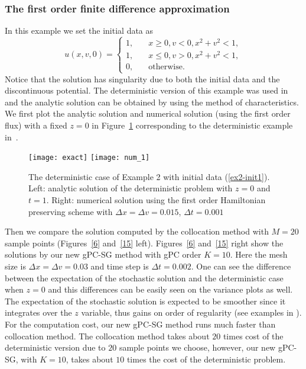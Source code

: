 \documentclass[12pt]{article}
\theoremstyle{plain}
\theoremstyle{remark}
\theoremstyle{remark}
\theoremstyle{remark}
\numberwithin{equation}{section}
\newcommand{\Dx}{\Delta x}
\newcommand{\Dt}{\Delta t}
\newcommand{\Dv}{\Delta v}
\begin{document}
\subsubsection{The first order finite difference approximation}
In this example we set the initial data as
\begin{equation}
  u(x,v,0)=
  \begin{cases}
    1, \quad &x\geq 0, v<0, x^2+v^2<1, \\
    1, \quad &x\leq 0, v>0, x^2+v^2<1, \\
    0, \quad &\text{otherwise}.
  \end{cases}
\label{ex2-init1}
\end{equation}
Notice that the solution has singularity due to both the initial data and the discontinuous potential. The deterministic version of this example was used in~\cite{Wen:2005ueba} and the analytic solution can be obtained by using the method of characteristics. We first plot the analytic solution and numerical solution (using the first order flux) with a fixed $z=0$ in Figure~\ref{9} corresponding to the deterministic example in~\cite{Wen:2005ueba}.
\begin{figure}
  \texttt{[image: exact]}
  \texttt{[image: num\_1]}
  \caption{The deterministic case of Example 2 with initial data (\ref{ex2-init1}). Left: analytic solution of the deterministic problem with $z=0$ and $t=1$. Right: numerical solution using the first order Hamiltonian preserving scheme with $\Delta x = \Delta v = 0.015$, $\Delta t = 0.001$}
  \label{9}
\end{figure}

Then we compare the solution computed by the collocation method with $M=20$ sample points (Figures~\ref{6} and~\ref{15} left). Figures~\ref{6} and~\ref{15} right show the solutions  by our new gPC-SG method with gPC order $K=10$. Here the mesh size is $\Dx=\Dv=0.03$ and time step is $\Dt=0.002$. One can see the difference between the expectation of the stochastic solution and the deterministic case when $z=0$ and this differences can be easily seen on the variance plots as well. The expectation of the stochastic solution is expected to be smoother
since it integrates over the $z$ variable, thus gains on order of regularity
(see examples in \cite{Des, HJX}).
For the computation cost, our new gPC-SG method runs much faster than collocation method. The collocation method takes about $20$ times cost of the deterministic version due to $20$ sample points we choose, however, our new gPC-SG,
with $K=10$,  takes about $10$ times the cost of the deterministic problem.
\end{document}
